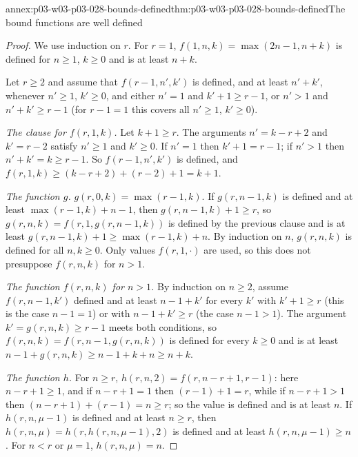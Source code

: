 \begin{annexitem}{annex:p03-w03-p03-028-bounds-defined}{thm:p03-w03-p03-028-bounds-defined}{The bound functions are well defined}
\begin{proof}
We use induction on \(r\).  For \(r=1\), \(f(1,n,k)=\max(2n-1,n+k)\) is
defined for \(n\geq1\), \(k\geq0\) and is at least \(n+k\).

Let \(r\geq2\) and assume that \(f(r-1,n',k')\) is defined, and at least
\(n'+k'\), whenever \(n'\geq1\), \(k'\geq0\), and either \(n'=1\) and
\(k'+1\geq r-1\), or \(n'>1\) and \(n'+k'\geq r-1\) (for \(r-1=1\) this
covers all \(n'\geq1\), \(k'\geq0\)).

\emph{The clause for \(f(r,1,k)\).}  Let \(k+1\geq r\).  The arguments
\(n'=k-r+2\) and \(k'=r-2\) satisfy \(n'\geq1\) and \(k'\geq0\).  If
\(n'=1\) then \(k'+1=r-1\); if \(n'>1\) then \(n'+k'=k\geq r-1\).  So
\(f(r-1,n',k')\) is defined, and
\(f(r,1,k)\geq(k-r+2)+(r-2)+1=k+1\).

\emph{The function \(g\).}  \(g(r,0,k)=\max(r-1,k)\).  If
\(g(r,n-1,k)\) is defined and at least \(\max(r-1,k)+n-1\), then
\(g(r,n-1,k)+1\geq r\), so \(g(r,n,k)=f(r,1,g(r,n-1,k))\) is defined by the
previous clause and is at least \(g(r,n-1,k)+1\geq\max(r-1,k)+n\).  By
induction on \(n\), \(g(r,n,k)\) is defined for all \(n,k\geq0\).  Only
values \(f(r,1,\cdot)\) are used, so this does not presuppose \(f(r,n,k)\)
for \(n>1\).

\emph{The function \(f(r,n,k)\) for \(n>1\).}  By induction on \(n\geq2\),
assume \(f(r,n-1,k')\) defined and at least \(n-1+k'\) for every \(k'\)
with \(k'+1\geq r\) (this is the case \(n-1=1\)) or with
\(n-1+k'\geq r\) (the case \(n-1>1\)).  The argument
\(k'=g(r,n,k)\geq r-1\) meets both conditions, so
\(f(r,n,k)=f(r,n-1,g(r,n,k))\) is defined for every \(k\geq0\) and is at
least \(n-1+g(r,n,k)\geq n-1+k+n\geq n+k\).

\emph{The function \(h\).}  For \(n\geq r\), \(h(r,n,2)=f(r,n-r+1,r-1)\):
here \(n-r+1\geq1\), and if \(n-r+1=1\) then \((r-1)+1=r\), while if
\(n-r+1>1\) then \((n-r+1)+(r-1)=n\geq r\); so the value is defined and is
at least \(n\).  If \(h(r,n,\mu-1)\) is defined and at least \(n\geq r\),
then \(h(r,n,\mu)=h(r,h(r,n,\mu-1),2)\) is defined and at least
\(h(r,n,\mu-1)\geq n\).  For \(n<r\) or \(\mu=1\), \(h(r,n,\mu)=n\).
\end{proof}
\end{annexitem}


